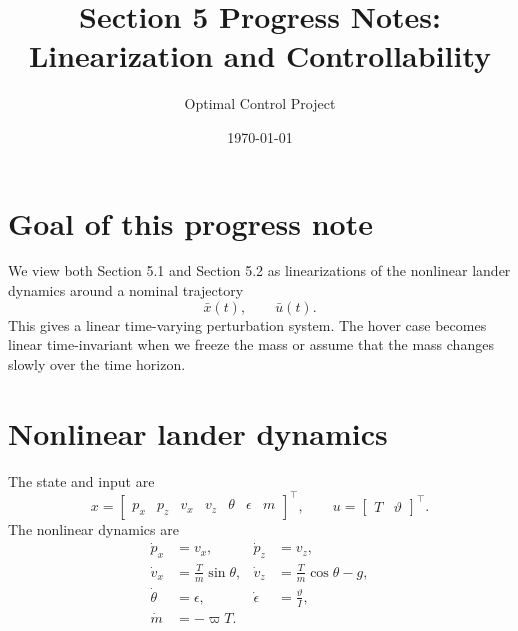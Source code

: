 \documentclass[10pt]{article}
\title{Section 5 Progress Notes: Linearization and Controllability}
\author{Optimal Control Project}
\date{\today}
\newcommand{\ub}{\bar u}
\newcommand{\xb}{\bar x}
\newcommand{\eps}{\epsilon}
\newcommand{\vphi}{\varpi}
\begin{document}
\maketitle

\section*{Goal of this progress note}
We view both Section 5.1 and Section 5.2 as linearizations of the nonlinear lander dynamics around a nominal trajectory
\[
    \xb(t),\qquad \ub(t).
\]
This gives a linear time-varying perturbation system. The hover case becomes linear time-invariant when we freeze the mass or assume that the mass changes slowly over the time horizon.

\section{Nonlinear lander dynamics}
The state and input are
\[
    x = \begin{bmatrix}p_x & p_z & v_x & v_z & \theta & \eps & m\end{bmatrix}^{\top},
    \qquad
    u = \begin{bmatrix}T & \vartheta\end{bmatrix}^{\top}.
\]
The nonlinear dynamics are
\begin{align}
    \dot p_x &= v_x, &
    \dot p_z &= v_z, \\
    \dot v_x &= \frac{T}{m}\sin\theta, &
    \dot v_z &= \frac{T}{m}\cos\theta - g, \\
    \dot\theta &= \eps, &
    \dot\eps &= \frac{\vartheta}{I}, \\
    \dot m &= -\vphi T.
\end{align}
\end{document}
